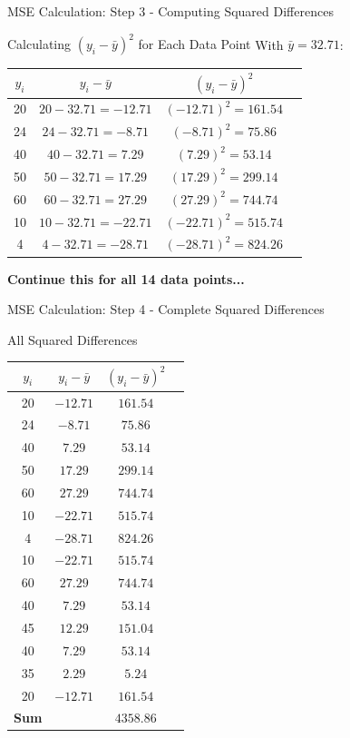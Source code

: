 \documentclass[usenames,dvipsnames]{beamer}
\begin{document}
\begin{frame}{MSE Calculation: Step 3 - Computing Squared Differences}
\begin{examplebox}{Calculating $(y_i - \bar{y})^2$ for Each Data Point}
\scriptsize
With $\bar{y} = 32.71$:

\vspace{0.2cm}
\begin{tabular}{|c|c|c|c|}
\hline
\textbf{$y_i$} & \textbf{$y_i - \bar{y}$} & \textbf{$(y_i - \bar{y})^2$} \\ \hline
20 & $20 - 32.71 = -12.71$ & $(-12.71)^2 = 161.54$ \\
24 & $24 - 32.71 = -8.71$ & $(-8.71)^2 = 75.86$ \\
40 & $40 - 32.71 = 7.29$ & $(7.29)^2 = 53.14$ \\
50 & $50 - 32.71 = 17.29$ & $(17.29)^2 = 299.14$ \\
60 & $60 - 32.71 = 27.29$ & $(27.29)^2 = 744.74$ \\
10 & $10 - 32.71 = -22.71$ & $(-22.71)^2 = 515.74$ \\
4 & $4 - 32.71 = -28.71$ & $(-28.71)^2 = 824.26$ \\
\hline
\end{tabular}
\end{examplebox}
\pause
\textbf{Continue this for all 14 data points...}
\end{frame}

\begin{frame}{MSE Calculation: Step 4 - Complete Squared Differences}
\begin{examplebox}{All Squared Differences}
\tiny
\begin{tabular}{|c|c|c|c|}
\hline
\textbf{$y_i$} & \textbf{$y_i - \bar{y}$} & \textbf{$(y_i - \bar{y})^2$} \\ \hline
20 & $-12.71$ & $161.54$ \\
24 & $-8.71$ & $75.86$ \\
40 & $7.29$ & $53.14$ \\
50 & $17.29$ & $299.14$ \\
60 & $27.29$ & $744.74$ \\
10 & $-22.71$ & $515.74$ \\
4 & $-28.71$ & $824.26$ \\
10 & $-22.71$ & $515.74$ \\
60 & $27.29$ & $744.74$ \\
40 & $7.29$ & $53.14$ \\
45 & $12.29$ & $151.04$ \\
40 & $7.29$ & $53.14$ \\
35 & $2.29$ & $5.24$ \\
20 & $-12.71$ & $161.54$ \\ \hline
\textbf{Sum} & & $\mathbf{4358.86}$ \\
\hline
\end{tabular}
\end{examplebox}
\end{frame}
\end{document}
